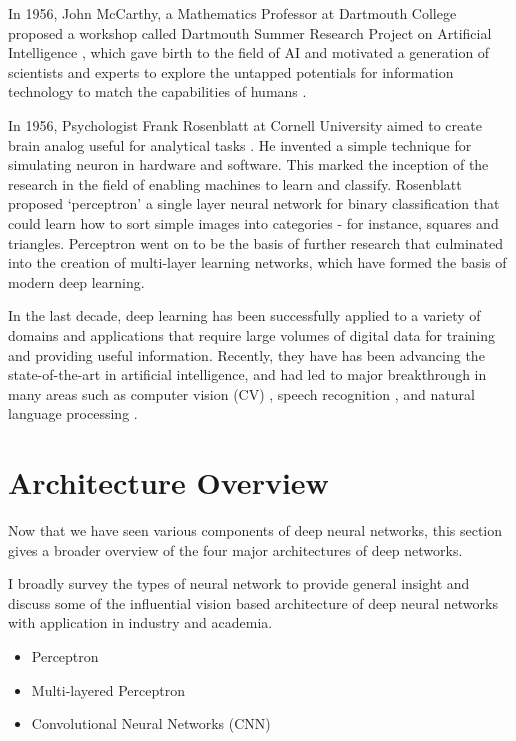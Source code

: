 In 1956, John McCarthy, a Mathematics Professor at Dartmouth College proposed a workshop called Dartmouth Summer Research Project on Artificial Intelligence \cite{edselc.2-52.0-3384609253620061201}, which gave birth to the field of AI and motivated a generation of scientists and experts to explore the untapped potentials for information technology to match the capabilities of humans \cite{sejnowski2018deep}.

In 1956, Psychologist Frank Rosenblatt at Cornell University aimed to create brain analog useful for analytical tasks \cite{2016397}.  He invented a simple technique for simulating neuron in hardware and software. This marked the inception of the research in the field of enabling machines to learn and classify. Rosenblatt proposed ‘perceptron’ a single layer neural network for binary classification that could learn how to sort simple images into categories - for instance, squares and triangles. Perceptron went on to be the basis of further research that culminated into the creation of multi-layer learning networks, which have formed the basis of modern deep learning\cite{2016397}.

In the last decade, deep learning has been successfully applied to a variety of domains and applications \cite{dl_evolution} that require large volumes of digital data for training and providing useful information. Recently, they have has been advancing the state-of-the-art in artificial intelligence, and had led to major breakthrough in many areas such as computer vision (CV) \cite{krizhevsky2012imagenet} \cite{karpathy2014large}, speech recognition \cite{graves2013speech} \cite{mohamed2012acoustic}, and natural language processing \cite{bengio2003neural} \cite{mikolov2013distributed} \cite{mikolov2010recurrent}.

\section{Architecture Overview}

Now that we have seen various components of deep neural networks, this section gives a broader overview of the four major architectures of deep networks.

I broadly survey the types of neural network to provide general insight and discuss some of the influential vision based architecture of deep neural networks with application in industry and academia. 

\begin{itemize}
\item Perceptron
\item  Multi-layered Perceptron
\item Convolutional Neural Networks (CNN)
\end{itemize}



